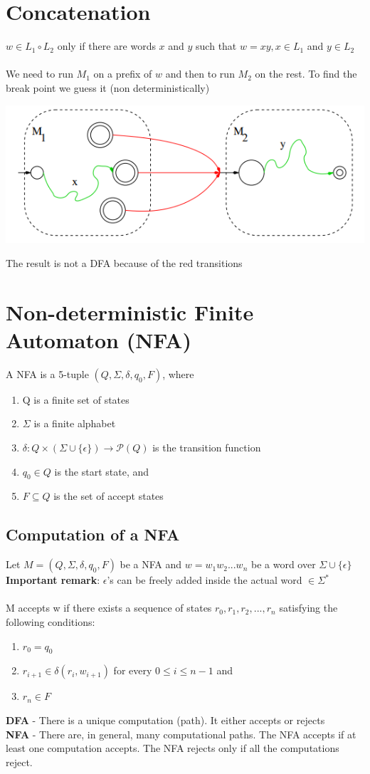 \documentclass{article}[18pt]
\begin{document}
\section{Concatenation}
$w\in L_1 \circ L_2$ only if there are words $x$ and $y$ such that $w=xy, x\in L_1$ and $y\in L_2$\\
\\
We need to run $M_1$ on a prefix of $w$ and then to run $M_2$ on the rest. To find the break point we guess it (non deterministically)
\begin{center}
	\includegraphics[scale=0.7]{concatenation1}
\end{center}
The result is not a DFA because of the red transitions
\section{Non-deterministic Finite Automaton (NFA)}
A NFA is a 5-tuple $(Q,\Sigma, \delta, q_0, F)$, where
\begin{enumerate}
	\item Q is a finite set of states
	\item $\Sigma$ is a finite alphabet
	\item $\delta: Q\times (\Sigma\cup \{\epsilon\})\rightarrow \mathscr{P}(Q)$ is the transition function
	\item $q_0\in Q$ is the start state, and
	\item $F\subseteq Q$ is the set of accept states
\end{enumerate}
\subsection{Computation of a NFA}
Let $M=(Q,\Sigma, \delta, q_0, F)$ be a NFA and $w=w_1w_2...w_n$ be a word over $\Sigma\cup \{\epsilon\}$\\
\textbf{Important remark}: $\epsilon$'s can be freely added inside the actual word $\in\Sigma^*$\\
\\
M accepts w if there exists a sequence of states $r_0,r_1,r_2,...,r_n$ satisfying the following conditions:
\begin{enumerate}
	\item $r_0=q_0$
	\item $r_{i+1}\in \delta(r_i,w_{i+1})$ for every $0\leqslant i\leqslant n-1$ and
	\item $r_n\in F$
\end{enumerate}
\textbf{DFA} - There is a unique computation (path). It either accepts or rejects\\
\textbf{NFA} - There are, in general, many computational paths. The NFA accepts if at least one computation accepts. The NFA rejects only if all the computations reject.
\end{document}
